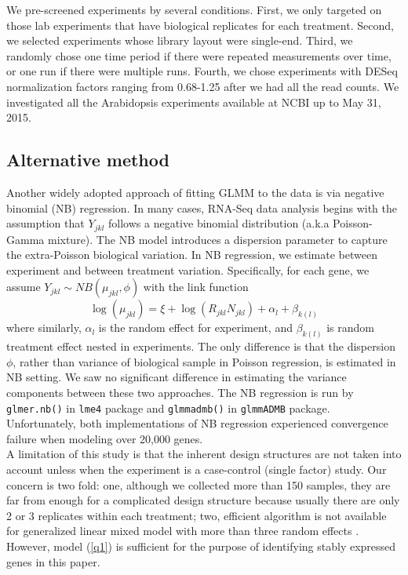 \documentclass[11pt, a4paper]{article}
\begin{document}
We pre-screened experiments by several conditions. First, we only targeted on those lab experiments that have biological replicates for each treatment. Second, we selected experiments whose library layout were single-end. Third, we randomly chose one time period if there were repeated measurements over time, or one run if there were multiple runs. Fourth, we chose experiments with DESeq normalization factors ranging from 0.68-1.25 after we had all the read counts. We investigated all the Arabidopsis experiments available at NCBI up to May 31, 2015.

  \subsection{Alternative method}
Another widely adopted approach of fitting GLMM to the data is via negative binomial (NB) regression. In many cases,  RNA-Seq data analysis begins with the assumption that $Y_{jkl}$ follows a negative binomial distribution (a.k.a Poisson-Gamma mixture). The NB model introduces a dispersion parameter to capture the extra-Poisson biological variation.  In NB regression, we estimate between experiment and between treatment variation. Specifically,  for each gene, we assume $Y_{jkl}\sim NB(\mu_{jkl}, \phi)$ with the link function
 \[\log(\mu_{jkl})= \xi + \log(R_{jkl}N_{jkl}) + \alpha_l + \beta_{k(l)}\]
where similarly, $\alpha_l$ is the random effect for experiment, and $\beta_{k(l)}$ is random treatment effect nested in experiments.  The only difference is that the dispersion $\phi$, rather than variance of biological sample in Poisson regression, is estimated in NB setting. We saw no significant difference in estimating the variance components between these two approaches. The NB regression is run by \verb"glmer.nb()" in \verb"lme4" package\citep{bates2012lme4} and \verb"glmmadmb()" in \verb"glmmADMB" package\citep{bolker2012getting}. Unfortunately, both implementations of NB regression experienced convergence failure when modeling over 20,000 genes. \\

A limitation of this study is that the inherent design structures are not taken into account unless when the experiment is a case-control (single factor) study. Our concern is two fold: one, although we collected more than 150 samples, they are far from enough for a complicated design structure because usually there are only 2 or 3 replicates within each treatment;  two, efficient algorithm is not available for generalized linear mixed model with more than three random effects \citep{bolker2009generalized}. However, model (\ref{q1}) is sufficient for the purpose of identifying stably expressed genes in this paper.
\end{document}
